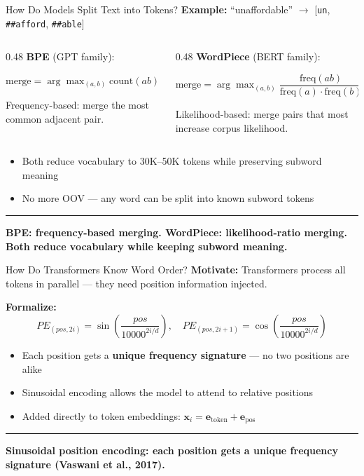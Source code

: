 \documentclass[8pt,aspectratio=169]{beamer}
\newcommand{\bottomnote}[1]{%
\vfill
\vspace{-2mm}
\textcolor{mllavender2}{\rule{\textwidth}{0.4pt}}
\vspace{1mm}
\footnotesize
\textbf{#1}
}
\newenvironment{compactlist}{%
  \begin{itemize}%
    \setlength{\itemsep}{2pt}%
    \setlength{\parskip}{0pt}%
    \setlength{\parsep}{0pt}%
}{%
  \end{itemize}%
}
\newcommand{\highlight}[1]{\textcolor{mlorange}{\textbf{#1}}}
\begin{document}
\begin{frame}{How Do Models Split Text into Tokens?}
\textbf{Example:} ``unaffordable'' $\to$ [\texttt{un}, \texttt{\#\#afford}, \texttt{\#\#able}]

\vspace{3mm}
\small
\begin{columns}[T]
\begin{column}{0.48\textwidth}
\textbf{BPE} (GPT family):

$\text{merge} = \arg\max_{(a,b)} \text{count}(ab)$

\vspace{1mm}
Frequency-based: merge the most common adjacent pair.
\end{column}
\begin{column}{0.48\textwidth}
\textbf{WordPiece} (BERT family):

$\text{merge} = \arg\max_{(a,b)} \dfrac{\text{freq}(ab)}{\text{freq}(a) \cdot \text{freq}(b)}$

\vspace{1mm}
Likelihood-based: merge pairs that most increase corpus likelihood.
\end{column}
\end{columns}
\normalsize

\vspace{3mm}
\begin{compactlist}
\item Both reduce vocabulary to 30K--50K tokens while preserving subword meaning
\item No more OOV --- any word can be split into known subword tokens
\end{compactlist}
\bottomnote{BPE: frequency-based merging. WordPiece: likelihood-ratio merging. Both reduce vocabulary while keeping subword meaning.}
\end{frame}

\begin{frame}{How Do Transformers Know Word Order?}
\textbf{Motivate:} Transformers process all tokens in parallel --- they need position information injected.

\vspace{3mm}
\textbf{Formalize:}
\[
PE_{(pos,2i)} = \sin\!\left(\frac{pos}{10000^{2i/d}}\right), \quad PE_{(pos,2i+1)} = \cos\!\left(\frac{pos}{10000^{2i/d}}\right)
\]

\vspace{2mm}
\begin{compactlist}
\item Each position gets a \highlight{unique frequency signature} --- no two positions are alike
\item Sinusoidal encoding allows the model to attend to relative positions
\item Added directly to token embeddings: $\mathbf{x}_i = \mathbf{e}_{\text{token}} + \mathbf{e}_{\text{pos}}$
\end{compactlist}
\bottomnote{Sinusoidal position encoding: each position gets a unique frequency signature (Vaswani et al., 2017).}
\end{frame}
\end{document}
